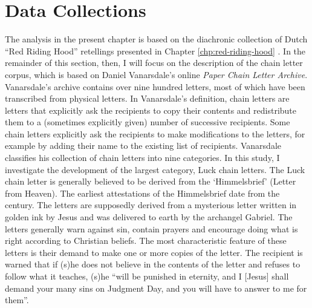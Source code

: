 \section{Data Collections}\label{sec:data-collection}

The analysis in the present chapter is based on the diachronic collection of Dutch ``Red Riding Hood'' retellings presented in Chapter \ref{chp:red-riding-hood} \autocite{folgert_karsdorp_2016_51588}. In the remainder of this section, then, I will focus on the description of the chain letter corpus, which is based on Daniel Vanarsdale's online \emph{Paper Chain Letter Archive}. Vanarsdale's archive contains over nine hundred letters, most of which have been transcribed from physical letters.\autocite{vanarsdale_archive:2015} In Vanarsdale's definition, chain letters are letters that explicitly ask the recipients to copy their contents and redistribute them to a (sometimes explicitly given) number of successive recipients. Some chain letters explicitly ask the recipients to make modifications to the letters, for example by adding their name to the existing list of recipients. Vanarsdale classifies his collection of chain letters into nine categories. In this study, I investigate the development of the largest category, Luck chain letters. The Luck chain letter is generally believed to be derived from the `Himmelsbrief' (Letter from Heaven)\autocite{vanarsdale:2015}. The earliest attestations of the Himmelsbrief date from the  century. The letters are supposedly derived from a mysterious letter written in golden ink by Jesus and was delivered to earth by the archangel Gabriel\autocite{ellis:2004}. The letters generally warn against sin, contain prayers and encourage doing what is right according to Christian beliefs. The most characteristic feature of these letters is their demand to make one or more copies of the letter. The recipient is warned that if (s)he does not believe in the contents of the letter and refuses to follow what it teaches, (s)he ``will be punished in eternity, and I [Jesus] shall demand your many sins on Judgment Day, and you will have to answer to me for them''\autocite{ellis:2004}.

